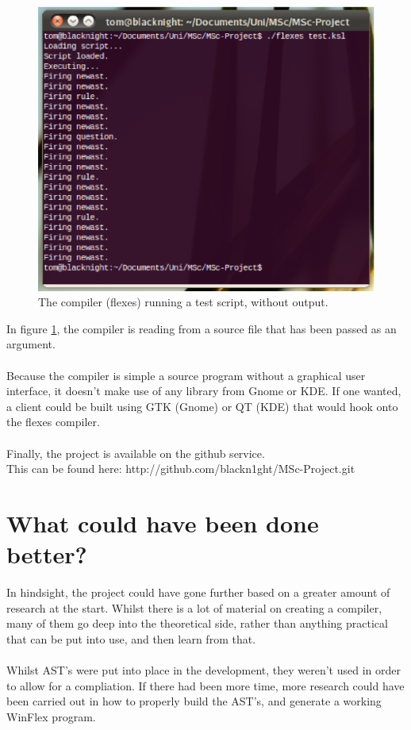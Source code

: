 \documentclass[12pt]{report}
\begin{document}
\begin{figure}[H]
	\centering
	\includegraphics[scale=0.75]{flexes}
	\caption{The compiler (flexes) running a test script, without output.}\label{fig:flexes}
\end{figure}
In figure \ref{fig:flexes}, the compiler is reading from a source file that has been passed as an argument.\\
\\
Because the compiler is simple a source program without a graphical user interface, it doesn't make use of any library from Gnome or KDE.  If one wanted, a client could be built using GTK (Gnome) or QT (KDE) that would hook onto the flexes compiler.
\\
\\
Finally, the project is available on the github service.\\This can be found here: http://github.com/blackn1ght/MSc-Project.git
\section{What could have been done better?}\label{sec:con:better}
In hindsight, the project could have gone further based on a greater amount of research at the start.  Whilst there is a lot of material on creating a compiler, many of them go deep into the theoretical side, rather than anything practical that can be put into use, and then learn from that.\\
\\
Whilst AST's were put into place in the development, they weren't used in order to allow for a compliation.  If there had been more time, more research could have been carried out in how to properly build the AST's, and generate a working WinFlex program.




\end{document}
